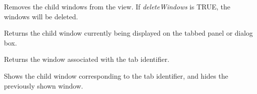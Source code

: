 

Removes the child windows from the view. If {\it deleteWindows} is TRUE, the windows will be deleted.



Returns the child window currently being displayed on the tabbed panel or dialog box.



Returns the window associated with the tab identifier.



Shows the child window corresponding to the tab identifier, and hides the previously shown window.


